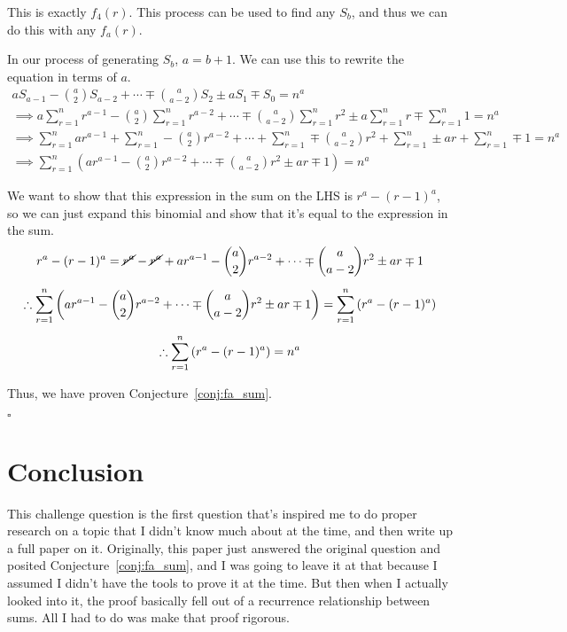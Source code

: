\documentclass[a4paper]{article}
\newcommand{\sn}{\sum\limits_{r=1}^{n}}
\begin{document}
This is exactly $f_4(r)$. This process can be used to find any $S_b$, and thus we can do this with any $f_a(r)$.

In our process of generating $S_b$, $a = b + 1$. We can use this to rewrite the equation in terms of $a$.
\begin{gather*}
aS_{a-1} - \binom{a}{2}S_{a-2} + \cdots \mp \binom{a}{a-2}S_2 \pm aS_1 \mp S_0 = n^a\\[0.5em]
\implies a \sn r^{a-1} - \binom{a}{2} \sn r^{a-2} + \cdots \mp \binom{a}{a-2} \sn r^2 \pm a \sn r \mp \sn 1 = n^a\\[0.5em]
\implies \sn a r^{a-1} + \sn -\binom{a}{2} r^{a-2} + \cdots + \sn \mp \binom{a}{a-2} r^2 + \sn \pm a r + \sn \mp 1 = n^a\\[0.5em]
\implies \sn \left( a r^{a-1} - \binom{a}{2} r^{a-2} + \cdots \mp \binom{a}{a-2} r^2 \pm a r \mp 1 \right) = n^a
\end{gather*}

We want to show that this expression in the sum on the LHS is $r^a - (r-1)^a$, so we can just expand this binomial and show that it's equal to the expression in the sum.
\begin{gather*}
r^a - (r-1)^a = \cancel{r^a} - \cancel{r^a} + ar^{a-1} - \binom{a}{2} r^{a-2} + \cdots \mp \binom{a}{a-2} r^2 \pm a r \mp 1\\[0.5em]
\therefore \sn \left( a r^{a-1} - \binom{a}{2} r^{a-2} + \cdots \mp \binom{a}{a-2} r^2 \pm a r \mp 1 \right) = \sn \left( r^a - (r-1)^a \right)\\[0.5em]
\therefore \sn \left( r^a - (r-1)^a \right) = n^a
\end{gather*}

Thus, we have proven Conjecture~\ref{conj:fa_sum}.

\hspace*{\fill}$\square$

\section{Conclusion}

This challenge question is the first question that's inspired me to do proper research on a topic that I didn't know much about at the time, and then write up a full paper on it. Originally, this paper just answered the original question and posited Conjecture~\ref{conj:fa_sum}, and I was going to leave it at that because I assumed I didn't have the tools to prove it at the time. But then when I actually looked into it, the proof basically fell out of a recurrence relationship between sums. All I had to do was make that proof rigorous.
\end{document}
